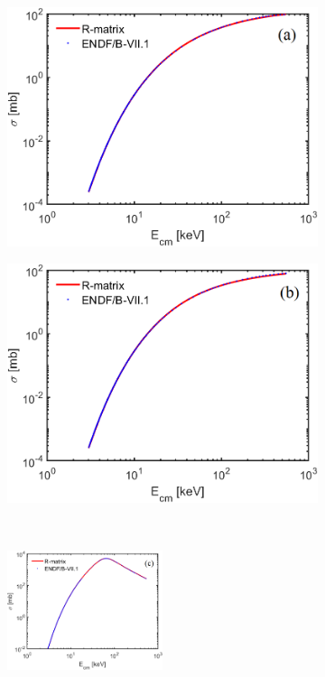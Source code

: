 \begin{figure}[H]
	\begin{subfigure}{0.5\textwidth}
		\centering
		\includegraphics[width=1\textwidth]{image/chap03/section_compare_ddn.png}
	\end{subfigure}
	\begin{subfigure}{0.5\textwidth}
		\centering
		\includegraphics[width=1\textwidth]{image/chap03/section_compare_ddtp.png}
	\end{subfigure}
	\\
	\begin{subfigure}{1\textwidth}
		\centering
		\includegraphics[width=0.5\textwidth]{image/chap03/section_compare_dt.png}

\end{subfigure}
\end{figure}
